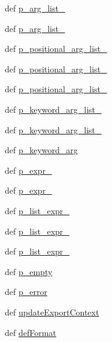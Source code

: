\begin{DoxyCompactItemize}
\item 
def \hyperlink{classisa__parser_1_1ISAParser_a92585e35bfede68f13b18d7e34e8782f}{p\_\-arg\_\-list\_}
\item 
def \hyperlink{classisa__parser_1_1ISAParser_a0c7ca8817b528e0a5f014d6dc00e3609}{p\_\-arg\_\-list\_}
\item 
def \hyperlink{classisa__parser_1_1ISAParser_a9e7e39d25a6a5ddee97421ecbe9a1334}{p\_\-positional\_\-arg\_\-list\_}
\item 
def \hyperlink{classisa__parser_1_1ISAParser_a439e179e35f3b0a2d79c0001a31e4167}{p\_\-positional\_\-arg\_\-list\_}
\item 
def \hyperlink{classisa__parser_1_1ISAParser_a17f4ddd9d2367afc4cdab328f7514a3e}{p\_\-positional\_\-arg\_\-list\_}
\item 
def \hyperlink{classisa__parser_1_1ISAParser_aa008a645d2cc21a46def4c82e8465149}{p\_\-keyword\_\-arg\_\-list\_}
\item 
def \hyperlink{classisa__parser_1_1ISAParser_aa1fb05e4bd5ab7918585d14d1d69ec9d}{p\_\-keyword\_\-arg\_\-list\_}
\item 
def \hyperlink{classisa__parser_1_1ISAParser_abfb5214c609bc972281bddd2bee0d8e6}{p\_\-keyword\_\-arg}
\item 
def \hyperlink{classisa__parser_1_1ISAParser_a5e7656279967abf20894ac1953923046}{p\_\-expr\_}
\item 
def \hyperlink{classisa__parser_1_1ISAParser_a57d960b34ec99ff885af4e58f0400444}{p\_\-expr\_}
\item 
def \hyperlink{classisa__parser_1_1ISAParser_a37372cd33afda930a2e6d57c05668f3d}{p\_\-list\_\-expr\_}
\item 
def \hyperlink{classisa__parser_1_1ISAParser_a9372a1e9334ec79a57803a9842b9a094}{p\_\-list\_\-expr\_}
\item 
def \hyperlink{classisa__parser_1_1ISAParser_a34bcb3b7558a6b333df6b1a897a9432e}{p\_\-list\_\-expr\_}
\item 
def \hyperlink{classisa__parser_1_1ISAParser_a7838c6749e452fa55c474e8b3f995a6c}{p\_\-empty}
\item 
def \hyperlink{classisa__parser_1_1ISAParser_ae0bf47d4531770b27bea904d5ed183f6}{p\_\-error}
\item 
def \hyperlink{classisa__parser_1_1ISAParser_a7fd83607e3ad062c6ead98ca8ed7ac59}{updateExportContext}
\item 
def \hyperlink{classisa__parser_1_1ISAParser_a86ce98d3b15ca3b7c2a3e954c5699cc8}{defFormat}
\item 

\end{DoxyCompactItemize}
